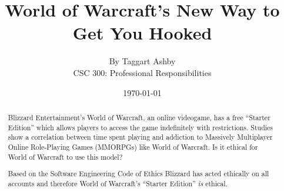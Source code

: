 \documentclass[11pt]{article}
\begin{document}


\title{\vfill World of Warcraft's New Way to Get You Hooked} %
\author{
By Taggart Ashby \vspace{10pt} \\
CSC 300: Professional Responsibilities  \vspace{10pt} \\
}
\date{\today} %

\maketitle


\vfill  %
\begin{abstract}
Blizzard Entertainment's World of Warcraft, an online videogame, has a free ``Starter Edition'' which allows players to access the game indefinitely with restrictions. \cite{starterEditionNewsRelease} Studies show a correlation between time spent playing and addiction to Massively Multiplayer Online Role-Playing Games (MMORPGs) like World of Warcraft. \cite{ProblemUsageAmongHighlyEngagedPlayers}\cite{JustAComputerGameRight} Is it ethical for World of Warcraft to use this model?

Based on the Software Engineering Code of Ethics \cite{SECode} Blizzard has acted ethically on all accounts and therefore World of Warcraft's ``Starter Edition'' \emph{is} ethical.
\end{abstract}

\thispagestyle{empty} %
\newpage


\thispagestyle{empty}  %
\tableofcontents
\end{document}
